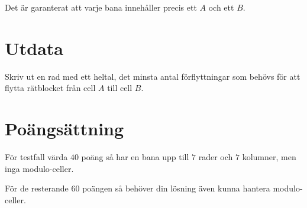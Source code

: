 Det är garanterat att varje bana innehåller precis ett $A$ och ett $B$.

\section*{Utdata}

Skriv ut en rad med ett heltal, det minsta antal förflyttningar som behövs för att flytta rätblocket från cell $A$ till cell $B$.

\section*{Poängsättning}

För testfall värda $40$ poäng så har en bana upp till $7$ rader och $7$ kolumner, men inga modulo-celler.

\noindent För de resterande $60$ poängen så behöver din lösning även kunna hantera modulo-celler.
